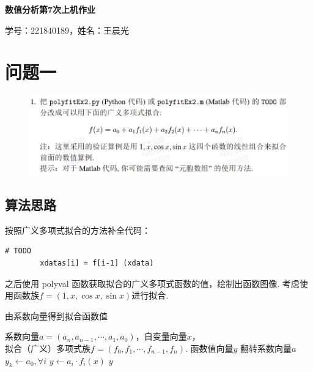\documentclass[UTF8,ctexart,a4paper,11pt,openany]{article}
\theoremstyle{definition}
\newcommand\e{\leftarrow}
\begin{document}
\begin{center}
{\huge \textbf{数值分析第7次上机作业}}

{\large 学号：221840189，姓名：王晨光}
\end{center}

\section{问题一}
    \begin{figure}[H]
        \centering
        \includegraphics[width=\linewidth]{pics/7pro1.png}
        \end{figure}
    \subsection{算法思路}
    按照广义多项式拟合的方法补全代码：

    \begin{lstlisting}[aboveskip=0pt]
        # TODO   
        xdatas[i] = f[i-1] (xdata)
    \end{lstlisting}
    之后使用 polyval 函数获取拟合的广义多项式函数的值，绘制出函数图像. 考虑使用函数族$f=(1,x,\cos x,\sin x)$进行拟合.
    \begin{algorithm}[H]
        \caption{由系数向量得到拟合函数值}
        \begin{algorithmic} %
            \Require 系数向量$a=(a_n,a_{n-1},\cdots,a_1,a_0)$，自变量向量$x$，\\拟合（广义）多项式族$f=(f_0,f_1,\cdots,f_{n-1},f_{n})$.
            \Ensure 函数值向量$y$
                \State 翻转系数向量$a$
                \State $y_k \e a_0, \forall i$
                    \State $y \e a_i\cdot f_i(x)$
                \EndFor
                \State \Return $y$ 
            \EndFunction
        \end{algorithmic}
    \end{algorithm}
\end{document}
